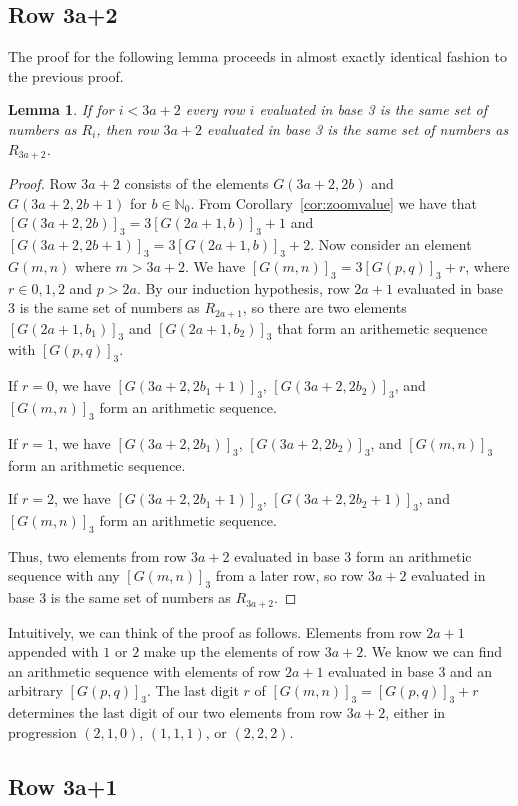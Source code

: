 \documentclass[12pt,reqno]{article}
\theoremstyle{plain}
\newtheorem{lemma}[theorem]{Lemma}
\theoremstyle{definition}
\theoremstyle{remark}
\begin{document}
\subsection{Row 3a+2}
The proof for the following lemma proceeds in almost exactly identical fashion to the previous proof.

\begin{lemma}\label{lemma:3a+2}
If for $i < 3a+2$ every row $i$ evaluated in base 3 is the same set of numbers as $R_i$, then row $3a+2$ evaluated in base 3 is the same set of numbers as $R_{3a+2}$.
\end{lemma}
\begin{proof}
Row $3a+2$ consists of the elements $G(3a+2,2b)$ and $G(3a+2,2b+1)$ for $b \in \mathbb{N}_0$. From Corollary~\ref{cor:zoomvalue} we have that $[G(3a+2,2b)]_3 = 3[G(2a+1,b)]_3+1$ and $[G(3a+2,2b+1)]_3 = 3[G(2a+1,b)]_3+2$. 
Now consider an element $G(m,n)$ where $m>3a+2$. We have $[G(m,n)]_3 = 3[G(p,q)]_3 + r$, where $r \in {0,1,2}$ and $p>2a$. By our induction hypothesis, row $2a+1$ evaluated in base 3 is the same set of numbers as $R_{2a+1}$, so there are two elements $[G(2a+1,b_1)]_3$ and $[G(2a+1,b_2)]_3$ that form an arithemetic sequence with $[G(p,q)]_3$. 

If $r = 0$, we have $[G(3a+2,2b_1+1)]_3$, $[G(3a+2,2b_2)]_3$, and $[G(m,n)]_3$ form an arithmetic sequence.

If $r = 1$, we have $[G(3a+2,2b_1)]_3$, $[G(3a+2,2b_2)]_3$, and $[G(m,n)]_3$ form an arithmetic sequence.

If $r = 2$, we have $[G(3a+2,2b_1+1)]_3$, $[G(3a+2,2b_2+1)]_3$, and $[G(m,n)]_3$ form an arithmetic sequence.

Thus, two elements from row $3a+2$ evaluated in base 3 form an arithmetic sequence with any $[G(m,n)]_3$ from a later row, so row $3a+2$ evaluated in base 3 is the same set of numbers as $R_{3a+2}$.
\end{proof}

Intuitively, we can think of the proof as follows. Elements from row $2a+1$ appended with $1$ or $2$ make up the elements of row $3a+2$. We know we can find an arithmetic sequence with elements of row $2a+1$ evaluated in base 3 and an arbitrary $[G(p,q)]_3$. The last digit $r$ of $[G(m,n)]_3 = [G(p,q)]_3 + r$ determines the last digit of our two elements from row $3a+2$, either in progression $(2,1,0)$, $(1,1,1)$, or $(2,2,2)$.


\subsection{Row 3a+1}
\end{document}
